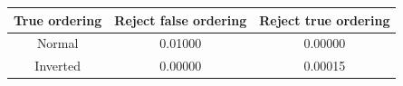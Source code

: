 \begin{tabular}{| c | c | c |}
\hline
True ordering & Reject false ordering & Reject true ordering \\
\hline
Normal & 0.01000 & 0.00000 \\
Inverted & 0.00000 & 0.00015 \\
\hline
\end{tabular}

